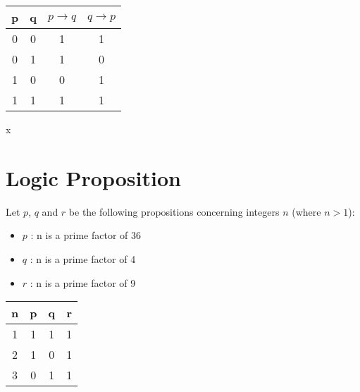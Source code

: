 \begin{center}
\begin{tabular}{|c|c|c|c|}
\hline
p & q & $p \rightarrow q$ & $q \rightarrow p$ \\
\hline
0 & 0 & 1& 1 \\
0 & 1 & 1 & 0 \\
1 & 0 & 0 & 1 \\
1 & 1 & 1 & 1 \\
\hline
\end{tabular}
\end{center}


\newpage

x


\section{Logic Proposition}

Let $p$, $q$ and $r$ be the following propositions concerning integers $n$ (where $n>1$):

\begin{itemize}
\item $p$ : n is a prime factor of 36 %
\item $q$ : n is a prime factor of 4 %
\item $r$ : n is a prime factor of 9 %
\end{itemize}


\begin{center}
\begin{tabular}{|c||c|c|c|}
\hline 
\phantom{spa} \textbf{n} \phantom{spa}	& \phantom{spa}	\textbf{p} \phantom{spa}	& \phantom{spa}	\textbf{q} \phantom{spa}	& \phantom{spa}	\textbf{r} \phantom{spa}	\\ \hline \hline
1	&	1	&	1	&	1	\\ \hline
2	&	1	&	0	&	1	\\ \hline
3	&	0	&	1	&	1	\\ \hline
\hline 
\end{tabular} 
\end{center}

